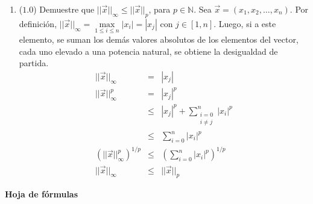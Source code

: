 \documentclass[12pt]{article}
\newcommand{\N}{\ensuremath{\mathbb{N}}}
\begin{document}
\begin{enumerate}[leftmargin=*,widest=9]
\begin{enumerate}[label=\alph*]
    \end{enumerate}
  \item (\(1.0\)) Demuestre que \( ||\vec{x}||_{\infty} \leq ||\vec{x}||_p\), para \(p \in \N\).
  Sea \(\vec{x} = (x_1, x_2, \ldots, x_n)\).
  Por definición, \( ||\vec{x}||_\infty = \max\limits_{1\leq i\leq n} |x_i|=|x_j|\) con \(j \in [1, n]\).
  Luego, si a este elemento, se suman los demás valores absolutos de los elementos del vector, cada uno elevado a una potencia natural, se obtiene la desigualdad de partida.
  \begin{eqnarray*}
  || \vec{x} ||_\infty &=& |x_j|\\
  || \vec{x} ||_\infty^p &=& |x_j|^p\\
  & \leq & |x_j|^p + \sum\limits_{\substack{i=0\\i\neq j}}^n |x_i|^p\\
  & \leq &  \sum\limits_{i=0}^n |x_i|^p\\
  (|| \vec{x} ||_\infty^p)^{1/p} & \leq & \left(\sum\limits_{i=0}^n |x_i|^p \right)^{1/p}\\
  || \vec{x} ||_\infty & \leq & || \vec{x} ||_p
  \end{eqnarray*}
  \end{enumerate}
\clearpage
\begin{center}
\textbf{Hoja de fórmulas}
\end{center}
\end{document}
